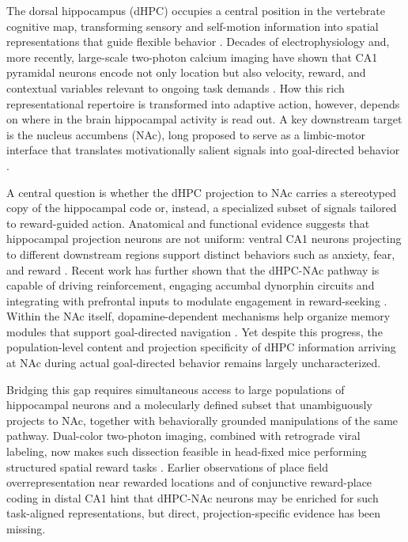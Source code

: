 \documentclass[11pt]{article}
\begin{document}
The dorsal hippocampus (dHPC) occupies a central position in the vertebrate cognitive map, transforming sensory and self-motion information into spatial representations that guide flexible behavior \citep{OKeefe1971PlaceCells,Skaggs1993Information}. Decades of electrophysiology and, more recently, large-scale two-photon calcium imaging have shown that CA1 pyramidal neurons encode not only location but also velocity, reward, and contextual variables relevant to ongoing task demands \citep{Gauthier2018Reward,Sosa2018Reward,Sato2020Overrepresentation}. How this rich representational repertoire is transformed into adaptive action, however, depends on where in the brain hippocampal activity is read out. A key downstream target is the nucleus accumbens (NAc), long proposed to serve as a limbic-motor interface that translates motivationally salient signals into goal-directed behavior \citep{Mogenson1980Motivation,Britt2012Synaptic}.

A central question is whether the dHPC projection to NAc carries a stereotyped copy of the hippocampal code or, instead, a specialized subset of signals tailored to reward-guided action. Anatomical and functional evidence suggests that hippocampal projection neurons are not uniform: ventral CA1 neurons projecting to different downstream regions support distinct behaviors such as anxiety, fear, and reward \citep{Ciocchi2015Selective,Bakoyiannis2023Pathway}. Recent work has further shown that the dHPC-NAc pathway is capable of driving reinforcement, engaging accumbal dynorphin circuits and integrating with prefrontal inputs to modulate engagement in reward-seeking \citep{Ibrahim2024DorsalHPC,Iyer2025Engagement}. Within the NAc itself, dopamine-dependent mechanisms help organize memory modules that support goal-directed navigation \citep{Jung2024Dopamine}. Yet despite this progress, the population-level content and projection specificity of dHPC information arriving at NAc during actual goal-directed behavior remains largely uncharacterized.

Bridging this gap requires simultaneous access to large populations of hippocampal neurons and a molecularly defined subset that unambiguously projects to NAc, together with behaviorally grounded manipulations of the same pathway. Dual-color two-photon imaging, combined with retrograde viral labeling, now makes such dissection feasible in head-fixed mice performing structured spatial reward tasks \citep{Tervo2016AAVretro,Chen2013GCaMP6,Dana2014Thy1GCaMP6}. Earlier observations of place field overrepresentation near rewarded locations and of conjunctive reward-place coding in distal CA1 \citep{Hok2007Goal,Mamad2017PlaceField,Xiao2020Conjunctive,Kaufman2020LocusCoeruleus} hint that dHPC-NAc neurons may be enriched for such task-aligned representations, but direct, projection-specific evidence has been missing.
\end{document}
